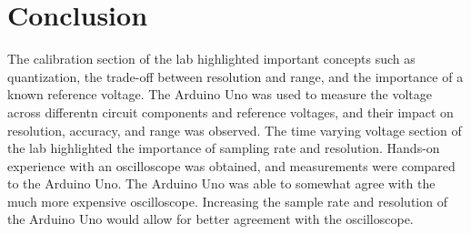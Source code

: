 \section{Conclusion}
\label{sec:conclusion}

\noindent The calibration section of the lab highlighted important concepts such as quantization, the trade-off between resolution and range, and the importance 
of a known reference voltage. The Arduino Uno was used to measure the voltage across differentn circuit components and reference voltages, and their 
impact on resolution, accuracy, and range was observed. The time varying voltage section of the lab highlighted the importance of sampling rate and 
resolution. Hands-on experience with an oscilloscope was obtained, and measurements were compared to the Arduino Uno. The Arduino Uno was able to
somewhat agree with the much more expensive oscilloscope. Increasing the sample rate and resolution of the Arduino Uno would allow for better agreement
with the oscilloscope.